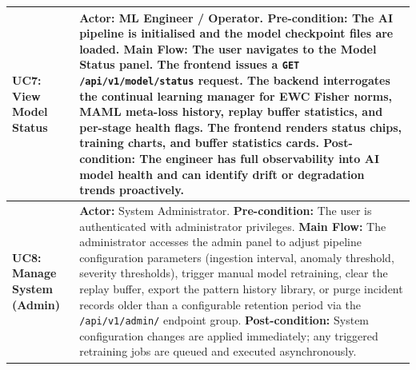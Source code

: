 \begin{center}
\begin{longtable}{|p{4cm}|p{9.8cm}|}
\textbf{UC7: View Model Status} &
\textbf{Actor:} ML Engineer / Operator. \newline
\textbf{Pre-condition:} The AI pipeline is initialised and the model checkpoint files are loaded. \newline
\textbf{Main Flow:} The user navigates to the Model Status panel. The frontend issues a \texttt{GET /api/v1/model/status} request. The backend interrogates the continual learning manager for EWC Fisher norms, MAML meta-loss history, replay buffer statistics, and per-stage health flags. The frontend renders status chips, training charts, and buffer statistics cards. \newline
\textbf{Post-condition:} The engineer has full observability into AI model health and can identify drift or degradation trends proactively. \\
\hline

\textbf{UC8: Manage System (Admin)} &
\textbf{Actor:} System Administrator. \newline
\textbf{Pre-condition:} The user is authenticated with administrator privileges. \newline
\textbf{Main Flow:} The administrator accesses the admin panel to adjust pipeline configuration parameters (ingestion interval, anomaly threshold, severity thresholds), trigger manual model retraining, clear the replay buffer, export the pattern history library, or purge incident records older than a configurable retention period via the \texttt{/api/v1/admin/} endpoint group. \newline
\textbf{Post-condition:} System configuration changes are applied immediately; any triggered retraining jobs are queued and executed asynchronously. \\
\hline

\end{longtable}
\end{center}

